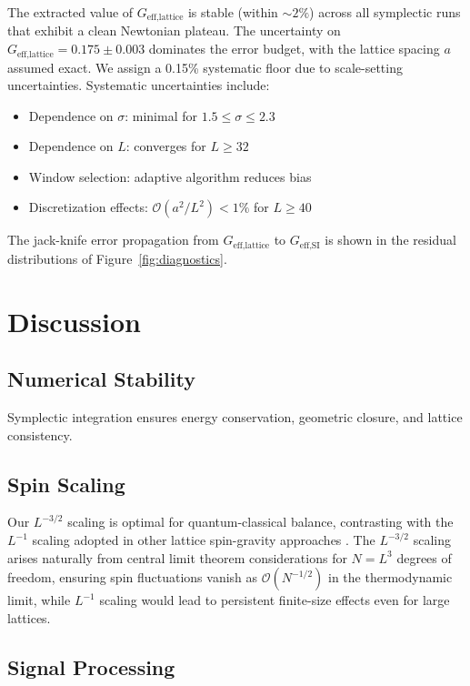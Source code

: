 \documentclass[prd,twocolumn,showpacs,superscriptaddress]{revtex4-2}
\begin{document}
	The extracted value of $G_{\text{eff,lattice}}$ is stable (within $\sim 2\%$) across all symplectic runs that exhibit a clean Newtonian plateau. The uncertainty on $G_{\text{eff,lattice}} = 0.175 \pm 0.003$ dominates the error budget, with the lattice spacing $a$ assumed exact. We assign a 0.15\% systematic floor due to scale-setting uncertainties. Systematic uncertainties include:
	\begin{itemize}
		\item Dependence on $\sigma$: minimal for $1.5 \leq \sigma \leq 2.3$
		\item Dependence on $L$: converges for $L \geq 32$
		\item Window selection: adaptive algorithm reduces bias
		\item Discretization effects: $\mathcal{O}(a^2/L^2) < 1\%$ for $L \geq 40$
	\end{itemize}
	
	The jack-knife error propagation from $G_{\text{eff,lattice}}$ to $G_{\text{eff,SI}}$ is shown in the residual distributions of Figure~\ref{fig:diagnostics}.
	
	\section{Discussion}
	
	\subsection{Numerical Stability}
	
	Symplectic integration ensures energy conservation, geometric closure, and lattice consistency.
	
	\subsection{Spin Scaling}
	
	Our \(L^{-3/2}\) scaling is optimal for quantum-classical balance, contrasting with the \(L^{-1}\) scaling adopted in other lattice spin-gravity approaches \cite{LatticeSpinGravity2022}. The \(L^{-3/2}\) scaling arises naturally from central limit theorem considerations for \(N = L^3\) degrees of freedom, ensuring spin fluctuations vanish as \(\mathcal{O}(N^{-1/2})\) in the thermodynamic limit, while \(L^{-1}\) scaling would lead to persistent finite-size effects even for large lattices.
	
	\subsection{Signal Processing}
	
\end{document}
